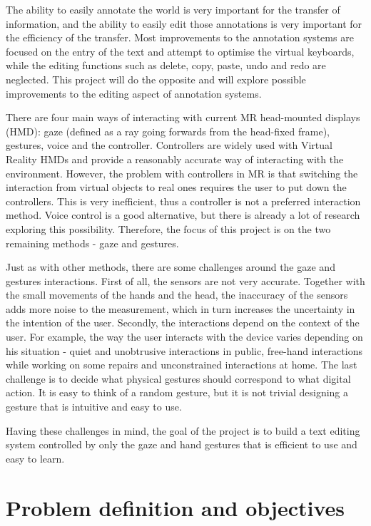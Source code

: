 \documentclass[a4paper, 12pt]{article}
\begin{document}
The ability to easily annotate the world is very important for the transfer of information, and the ability to easily edit those annotations is very important for the efficiency of the transfer. Most improvements to the annotation systems are focused on the entry of the text and attempt to optimise the virtual keyboards, while the editing functions such as delete, copy, paste, undo and redo are neglected. This project will do the opposite and will explore possible improvements to the editing aspect of annotation systems.

There are four main ways of interacting with current MR head-mounted displays (HMD): gaze (defined as a ray going forwards from the head-fixed frame), gestures, voice and the controller. Controllers are widely used with Virtual Reality HMDs and provide a reasonably accurate way of interacting with the environment. However, the problem with controllers in MR is that switching the interaction from virtual objects to real ones requires the user to put down the controllers. This is very inefficient, thus a controller is not a preferred interaction method. Voice control is a good alternative, but there is already a lot of research exploring this possibility. Therefore, the focus of this project is on the two remaining methods - gaze and gestures.

Just as with other methods, there are some challenges around the gaze and gestures interactions. First of all, the sensors are not very accurate. Together with the small movements of the hands and the head, the inaccuracy of the sensors adds more noise to the measurement, which in turn increases the uncertainty in the intention of the user. Secondly, the interactions depend on the context of the user. For example, the way the user interacts with the device varies depending on his situation - quiet and unobtrusive interactions in public, free-hand interactions while working on some repairs and unconstrained interactions at home. The last challenge is to decide what physical gestures should correspond to what digital action. It is easy to think of a random gesture, but it is not trivial designing a gesture that is intuitive and easy to use.

Having these challenges in mind, the goal of the project is to build a text editing system controlled by only the gaze and hand gestures that is efficient to use and easy to learn.

\section{Problem definition and objectives}
\end{document}
